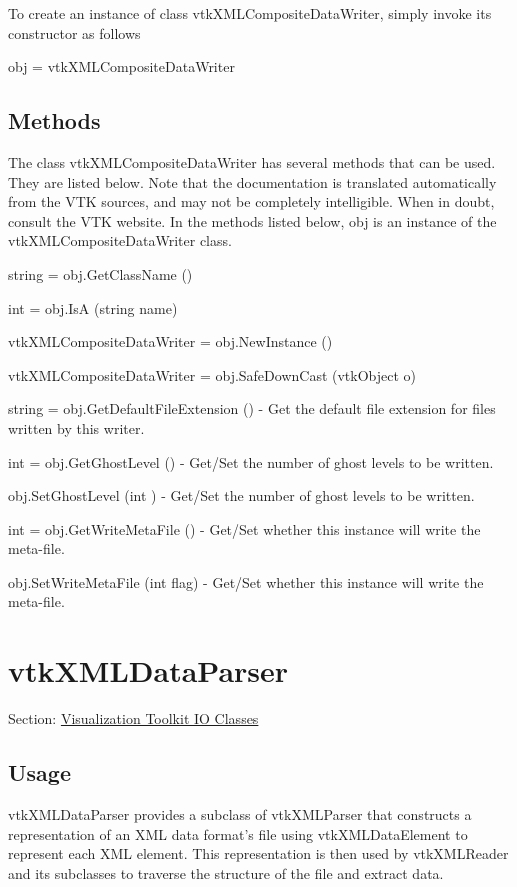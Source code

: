 To create an instance of class vtk\-X\-M\-L\-Composite\-Data\-Writer, simply invoke its constructor as follows \begin{DoxyVerb}  obj = vtkXMLCompositeDataWriter
\end{DoxyVerb}
 \hypertarget{vtkwidgets_vtkxyplotwidget_Methods}{}\subsection{Methods}\label{vtkwidgets_vtkxyplotwidget_Methods}
The class vtk\-X\-M\-L\-Composite\-Data\-Writer has several methods that can be used. They are listed below. Note that the documentation is translated automatically from the V\-T\-K sources, and may not be completely intelligible. When in doubt, consult the V\-T\-K website. In the methods listed below, {\ttfamily obj} is an instance of the vtk\-X\-M\-L\-Composite\-Data\-Writer class. 
\begin{DoxyItemize}
\item {\ttfamily string = obj.\-Get\-Class\-Name ()}  
\item {\ttfamily int = obj.\-Is\-A (string name)}  
\item {\ttfamily vtk\-X\-M\-L\-Composite\-Data\-Writer = obj.\-New\-Instance ()}  
\item {\ttfamily vtk\-X\-M\-L\-Composite\-Data\-Writer = obj.\-Safe\-Down\-Cast (vtk\-Object o)}  
\item {\ttfamily string = obj.\-Get\-Default\-File\-Extension ()} -\/ Get the default file extension for files written by this writer.  
\item {\ttfamily int = obj.\-Get\-Ghost\-Level ()} -\/ Get/\-Set the number of ghost levels to be written.  
\item {\ttfamily obj.\-Set\-Ghost\-Level (int )} -\/ Get/\-Set the number of ghost levels to be written.  
\item {\ttfamily int = obj.\-Get\-Write\-Meta\-File ()} -\/ Get/\-Set whether this instance will write the meta-\/file.  
\item {\ttfamily obj.\-Set\-Write\-Meta\-File (int flag)} -\/ Get/\-Set whether this instance will write the meta-\/file.  
\end{DoxyItemize}\hypertarget{vtkio_vtkxmldataparser}{}\section{vtk\-X\-M\-L\-Data\-Parser}\label{vtkio_vtkxmldataparser}
Section\-: \hyperlink{sec_vtkio}{Visualization Toolkit I\-O Classes} \hypertarget{vtkwidgets_vtkxyplotwidget_Usage}{}\subsection{Usage}\label{vtkwidgets_vtkxyplotwidget_Usage}
vtk\-X\-M\-L\-Data\-Parser provides a subclass of vtk\-X\-M\-L\-Parser that constructs a representation of an X\-M\-L data format's file using vtk\-X\-M\-L\-Data\-Element to represent each X\-M\-L element. This representation is then used by vtk\-X\-M\-L\-Reader and its subclasses to traverse the structure of the file and extract data.

